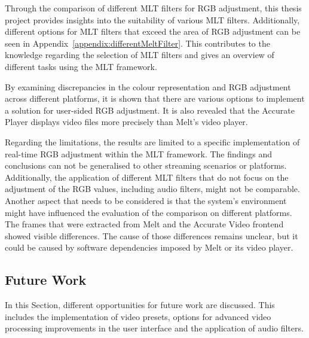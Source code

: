\documentclass[../MasterThesis.tex]{subfiles}
\begin{document}
Through the comparison of different MLT filters for RGB adjustment, this thesis project provides insights into the suitability of various MLT filters. Additionally, different options for MLT filters that exceed the area of RGB adjustment can be seen in Appendix~\ref{appendix:differentMeltFilter}.
This contributes to the knowledge regarding the selection of MLT filters and gives an overview of different tasks using the MLT framework.


By examining discrepancies in the colour representation and RGB adjustment across different platforms, it is shown that there are various options to implement a solution for user-sided RGB adjustment. It is also revealed that the Accurate Player displays video files more precisely than Melt's video player.


Regarding the limitations, the results are limited to a specific implementation of real-time RGB adjustment within the MLT framework. The findings and conclusions can not be generalised to other streaming scenarios or platforms. 
Additionally, the application of different MLT filters that do not focus on the adjustment of the RGB values, including audio filters, might not be comparable. 
%
Another aspect that needs to be considered is that the system's environment might have influenced the evaluation of the comparison on different platforms. The frames that were extracted from Melt and the Accurate Video frontend showed visible differences. The cause of those differences remains unclear, but it could be caused by software dependencies imposed by Melt or its video player.

	

	
	
	
	





\subsection{Future Work} \label{subsection:futurework}


In this Section, different opportunities for future work are discussed. This includes the implementation of video presets, options for advanced video processing improvements in the user interface and the application of audio filters.
\end{document}
